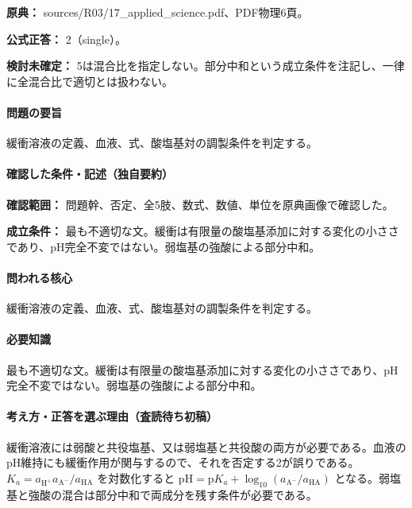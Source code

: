 \noindent\textbf{原典：} sources/R03/17\_applied\_science.pdf、PDF物理6頁。

\textbf{公式正答：} 2（single）。

\par\textbf{検討未確定：} 5は混合比を指定しない。部分中和という成立条件を注記し、一律に全混合比で適切とは扱わない。

\paragraph{問題の要旨} 緩衝溶液の定義、血液、式、酸塩基対の調製条件を判定する。

\paragraph{確認した条件・記述（独自要約）}\mbox{}\par

\noindent\textbf{確認範囲：} 問題幹、否定、全5肢、数式、数値、単位を原典画像で確認した。\par

\noindent\textbf{成立条件：} 最も不適切な文。緩衝は有限量の酸塩基添加に対する変化の小ささであり、pH完全不変ではない。弱塩基の強酸による部分中和。\par

\paragraph{問われる核心} 緩衝溶液の定義、血液、式、酸塩基対の調製条件を判定する。

\paragraph{必要知識} 最も不適切な文。緩衝は有限量の酸塩基添加に対する変化の小ささであり、pH完全不変ではない。弱塩基の強酸による部分中和。

\paragraph{考え方・正答を選ぶ理由（査読待ち初稿）} 緩衝溶液には弱酸と共役塩基、又は弱塩基と共役酸の両方が必要である。血液のpH維持にも緩衝作用が関与するので、それを否定する2が誤りである。\(K_a=a_{\mathrm{H^+}}a_{\mathrm{A^-}}/a_{\mathrm{HA}}\) を対数化すると \(\mathrm{pH=p}K_a+\log_{10}(a_{\mathrm{A^-}}/a_{\mathrm{HA}})\) となる。弱塩基と強酸の混合は部分中和で両成分を残す条件が必要である。

